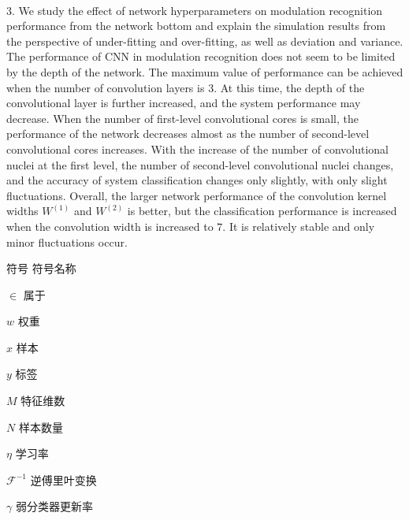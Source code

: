 \begin{englishabstract}
\par~\par
3. We study the effect of network hyperparameters on modulation recognition performance from the network bottom and explain the simulation results from the perspective of under-fitting and over-fitting, as well as deviation and variance. The performance of CNN in modulation recognition does not seem to be limited by the depth of the network. The maximum value of performance can be achieved when the number of convolution layers is $3$. At this time, the depth of the convolutional layer is further increased, and the system performance may decrease. When the number of first-level convolutional cores is small, the performance of the network decreases almost as the number of second-level convolutional cores increases. With the increase of the number of convolutional nuclei at the first level, the number of second-level convolutional nuclei changes, and the accuracy of system classification changes only slightly, with only slight fluctuations. Overall, the larger network performance of the convolution kernel widths $W^{(1)}$ and $W^{(2)}$ is better, but the classification performance is increased when the convolution width is increased to $7$. It is relatively stable and only minor fluctuations occur.
~\par
{}

\end{englishabstract}



\XDUpremainmatter

\begin{symbollist}
\item [符号] \hspace{12em} {符号名称}
\item [$\in$]\hspace{12.5em} {属于}
\item [$w$] \hspace{12.5em} {权重}
\item [$x$] \hspace{12.5em} {样本}
\item [$y$] \hspace{12.5em} {标签}
\item [$M$] \hspace{12.5em} {特征维数}
\item [$N$] \hspace{12.5em} {样本数量}
\item [$\eta$] \hspace{12.5em} {学习率}
\item [$\mathcal{F}^{-1}$] \hspace{12.5em} {逆傅里叶变换}
\item [$\gamma$] \hspace{12.5em} {弱分类器更新率}
\end{symbollist}

